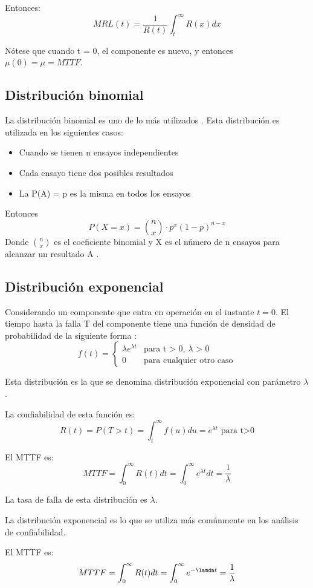 Entonces: $$MRL(t) = \frac{1}{R(t)}\int_t^\infty R(x)dx$$

Nótese que cuando t = 0, el componente es nuevo, y entonces $\mu(0) = \mu = MTTF$.

\subsection{Distribución binomial}
La distribución binomial es uno de lo más utilizados \citep{Rausand04}. Esta distribución es utilizada en los siguientes casos:
\begin{itemize}
  \item Cuando se tienen n ensayos independientes
  \item Cada ensayo tiene dos posibles resultados
  \item La P(A) = p es la misma en todos los ensayos
\end{itemize}

Entonces $$P(X=x) = {{n}\choose{x}} \cdot p^x (1-p)^{n-x}$$ Donde ${n}\choose{x}$ es el coeficiente binomial y X es el número de n ensayos para alcanzar un resultado A \citep{Rausand04}.

\subsection{Distribución exponencial}
Considerando un componente que entra en operación en el instante $t=0$. El tiempo hasta la falla T del componente tiene una función de densidad de probabilidad de la siguiente forma \cite{Rausand04}:
$$ f(t) =\left \{
\begin{matrix}
  \lambda e^{\lambda t } & \text{para t > 0, } \lambda \text{ > 0}\\
  0                      & \text{para cualquier otro caso}
\end{matrix}
$$

Esta distribución es la que se denomina distribución exponencial con parámetro $\lambda$.

La confiabilidad de esta función  es: $$R(t) = P (T>t) = \int_t^\infty f(u) du  = e^{\lambda t} \text{ para t>0} $$

El \ac{MTTF} es: $$MTTF = \int_0^\infty R(t) dt = \int_0^\infty e^{\lambda t} dt  = \frac{1}{\lambda}$$

La tasa de falla de esta distribución es $\lambda$.

La distribución exponencial es lo que se utiliza más comúnmente en los análisis de confiabilidad.

El \ac{MTTF} es: $$MTTF = \int_0^\infty R(t)dt = \int_0^\infty e^{-\lamda t} = \frac{1}{\lambda}$$

